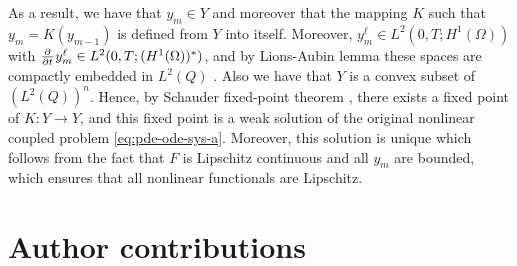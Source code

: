 \documentclass[11pt]{article}
\numberwithin{equation}{section}
\begin{document}
As a result, we have that \(y_m \in Y\) and moreover that the mapping \(K\) such that \( y_m = K(y_{m-1})\) is defined from \(Y \) into itself. Moreover, 
\(y_m^\ell \in L^2(0,T; H^1(\Omega))\) with \(\pd{ }{t} y_m^\ell \in L^2(0,T; (H^1(\Omega))^*)\), and 
by Lions-Aubin lemma these spaces are compactly embedded in \(L^2(Q)\) \cite{Aubin-1963}. Also we have that \(Y\) is a convex subset of \((L^2(Q))^n\). 
Hence, by Schauder fixed-point theorem \cite{Zeidler-1998}, there exists a fixed point of \(K:Y\to Y\), and this fixed point is a weak solution of the original nonlinear coupled problem \eqref{eq:pde-ode-sys-a}. Moreover, this  solution is unique which follows from the fact that \(F\) is Lipschitz continuous and all \(y_m\) are bounded, which ensures that all nonlinear functionals are Lipschitz.































\section{Author contributions}
\end{document}
